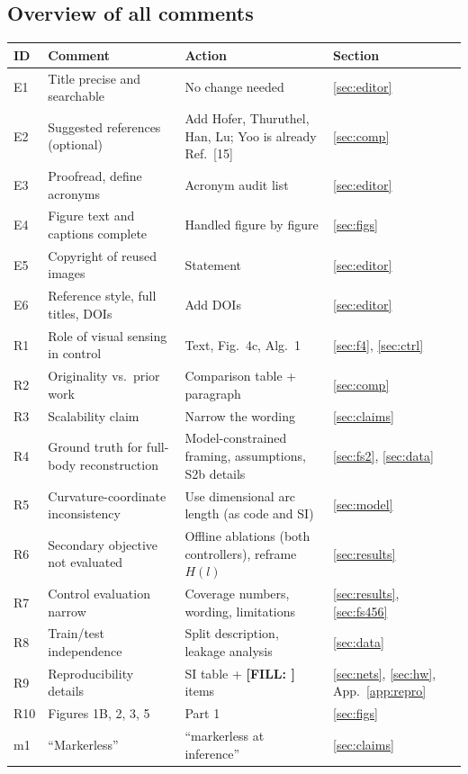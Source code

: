 \documentclass[10pt,a4paper]{article}
\newcommand{\FILL}[1]{\textcolor{orange!85!black}{\textbf{[FILL: #1]}}}
\begin{document}
\subsection*{Overview of all comments}
\small
\begin{longtable}{p{0.8cm}p{6.4cm}p{6.3cm}p{1.6cm}}
\toprule
ID & Comment & Action & Section\\\midrule\endhead
E1 & Title precise and searchable & No change needed & \ref{sec:editor}\\
E2 & Suggested references (optional) & Add Hofer, Thuruthel, Han, Lu; Yoo is already Ref.~[15] & \ref{sec:comp}\\
E3 & Proofread, define acronyms & Acronym audit list & \ref{sec:editor}\\
E4 & Figure text and captions complete & Handled figure by figure & \ref{sec:figs}\\
E5 & Copyright of reused images & Statement & \ref{sec:editor}\\
E6 & Reference style, full titles, DOIs & Add DOIs & \ref{sec:editor}\\\midrule
R1 & Role of visual sensing in control & Text, Fig.~4c, Alg.~1 & \ref{sec:f4}, \ref{sec:ctrl}\\
R2 & Originality vs.\ prior work & Comparison table + paragraph & \ref{sec:comp}\\
R3 & Scalability claim & Narrow the wording & \ref{sec:claims}\\
R4 & Ground truth for full-body reconstruction & Model-constrained framing, assumptions, S2b details & \ref{sec:fs2}, \ref{sec:data}\\
R5 & Curvature-coordinate inconsistency & Use dimensional arc length (as code and SI) & \ref{sec:model}\\
R6 & Secondary objective not evaluated & Offline ablations (both controllers), reframe $H(l)$ & \ref{sec:results}\\
R7 & Control evaluation narrow & Coverage numbers, wording, limitations & \ref{sec:results}, \ref{sec:fs456}\\
R8 & Train/test independence & Split description, leakage analysis & \ref{sec:data}\\
R9 & Reproducibility details & SI table + \FILL{} items & \ref{sec:nets}, \ref{sec:hw}, App.~\ref{app:repro}\\
R10 & Figures 1B, 2, 3, 5 & Part 1 & \ref{sec:figs}\\\midrule
m1 & ``Markerless'' & ``markerless at inference'' & \ref{sec:claims}\\

\end{longtable}
\end{document}
